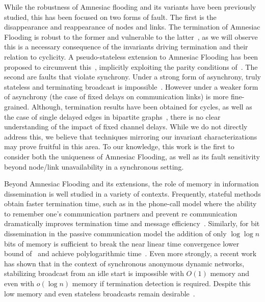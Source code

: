 While the robustness of Amnesiac flooding and its variants have been previously studied, this has been focused on two forms of fault. The first is the disappearance and reappearance of nodes and links. The termination of Amnesiac Flooding is robust to the former and vulnerable to the latter~\cite{hussak2023termination}, as we will observe this is a necessary consequence of the invariants driving termination and their relation to cyclicity. A pseudo-stateless extension to Amnesiac Flooding has been proposed to circumvent this~\cite{turau2021synchronous}, implicitly exploiting the parity conditions of~\cite{hussak2023termination}. The second are faults that violate synchrony. Under a strong form of asynchrony, truly stateless and terminating broadcast is impossible~\cite{turau2020stateless}. However under a weaker form of asynchrony (the case of fixed delays on communication links) is more fine-grained. Although, termination results have been obtained for cycles, as well as the case of single delayed edges in bipartite graphs~\cite{hussak2023termination}, there is no clear understanding of the impact of fixed channel delays. While we do not directly address this, we believe that techniques mirroring our invariant characterizations may prove fruitful in this area. To our knowledge, this work is the first to consider both the uniqueness of Amnesiac Flooding, as well as its fault sensitivity beyond node/link unavailability in a synchronous setting.

Beyond Amnesiac Flooding and its extensions, the role of memory in information dissemination is well studied in a variety of contexts. Frequently, stateful methods obtain faster termination time, such as in the phone-call model where the ability to remember one's communication partners and prevent re communication dramatically improves termination time and message efficiency~\cite{RandomisedBroadcastFirst,RandomisedBroadcastFinal,SocialNetworksSpreadRumors}. 
Similarly, for bit dissemination in the passive communication model the addition of only $\log{\log{n}}$ bits of memory is sufficient to break the near linear time convergence lower bound of~\cite{LimitsofInformationSpread} and achieve polylogarithmic time~\cite{korman2022early}. 
Even more strongly, a recent work~\cite{MemoryLowerBoundsDISC} has shown that in the context of synchronous anonymous dynamic networks, stabilizing broadcast from an idle start is impossible with $O(1)$ memory and even with $o(\log{n})$ memory if termination detection is required.
Despite this low memory and even stateless broadcasts remain desirable~\cite{gopal1999fast}. 


